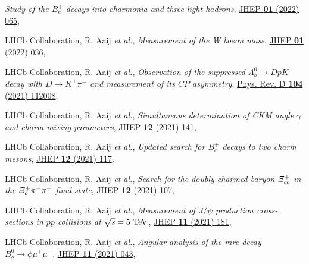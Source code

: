 \begin{cvcontent}
\begin{enumerate}[label={[\arabic*]}, leftmargin=1.5cm]
    \emph{Study of the $B_c^+$ decays into charmonia and three light hadrons},
    \href{https://doi.org/10.1007/JHEP01(2022)065}{JHEP \textbf{01} (2022) 065},
    \item LHCb Collaboration, R. Aaij \emph{et al.}, 
    \emph{Measurement of the W boson mass}, 
    \href{https://doi.org/10.1007/JHEP01(2022)036}{JHEP \textbf{01} (2022) 036},
    \item LHCb Collaboration, R. Aaij \emph{et al.}, 
    \emph{Observation of the suppressed $\Lambda_b^0\to D p K^-$ decay with $D\to K^+ \pi^-$ and measurement of its $C\!P$ asymmetry}, 
    \href{https://link.aps.org/doi/10.1103/PhysRevD.104.112008}{Phys. Rev. D \textbf{104} (2021) 112008},
    \item LHCb Collaboration, R. Aaij \emph{et al.}, 
    \emph{Simultaneous determination of CKM angle $\gamma$ and charm mixing parameters},
    \href{https://doi.org/10.1007/JHEP12(2021)141}{JHEP \textbf{12} (2021) 141},
    \sloppy
    \item LHCb Collaboration, R. Aaij \emph{et al.}, 
    \emph{Updated search for $B_c^+$ decays to two charm mesons},
    \href{https://doi.org/10.1007/JHEP12(2021)117}{JHEP \textbf{12} (2021) 117},
    \item LHCb Collaboration, R. Aaij \emph{et al.}, 
    \emph{Search for the doubly charmed baryon $\it{\Xi}_{cc}^{+}$ in the $\it{\Xi}_{c}^{+} \pi^{-} \pi^{+}$ final state},
    \href{https://doi.org/10.1007/JHEP12(2021)107}{JHEP \textbf{12} (2021) 107},
    \item LHCb Collaboration, R. Aaij \emph{et al.}, 
    \emph{Measurement of $J/\psi$ production cross-sections in $pp$ collisions at $\sqrt{s}=5~\rm{TeV}$},
    \href{http://dx.doi.org/10.1007/JHEP11(2021)181}{JHEP \textbf{11} (2021) 181},
    \sloppy
    \item LHCb Collaboration, R. Aaij \emph{et al.}, 
    \emph{Angular analysis of the rare decay $B_s^0 \to \phi \mu^+ \mu^-$},
    \href{http://dx.doi.org/10.1007/JHEP11(2021)043}{JHEP \textbf{11} (2021) 043},
  \end{enumerate}
\end{cvcontent}